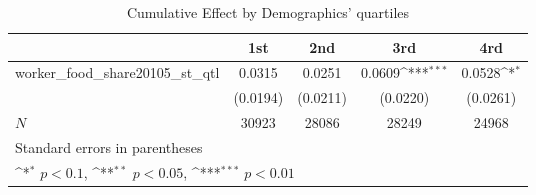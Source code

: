 \begin{table}[htbp]\centering
\def\sym#1{\ifmmode^{#1}\else\(^{#1}\)\fi}
\caption{Cumulative Effect by Demographics' quartiles}
\begin{tabular}{l*{4}{c}}
\hline\hline
            &\multicolumn{1}{c}{1st}&\multicolumn{1}{c}{2nd}&\multicolumn{1}{c}{3rd}&\multicolumn{1}{c}{4rd}\\
\hline
worker\_food\_share20105\_st\_qtl&      0.0315         &      0.0251         &      0.0609\sym{***}&      0.0528\sym{*}  \\
            &    (0.0194)         &    (0.0211)         &    (0.0220)         &    (0.0261)         \\
\hline
\(N\)       &       30923         &       28086         &       28249         &       24968         \\
\hline\hline
\multicolumn{5}{l}{\footnotesize Standard errors in parentheses}\\
\multicolumn{5}{l}{\footnotesize \sym{*} \(p<0.1\), \sym{**} \(p<0.05\), \sym{***} \(p<0.01\)}\\
\end{tabular}
\end{table}
